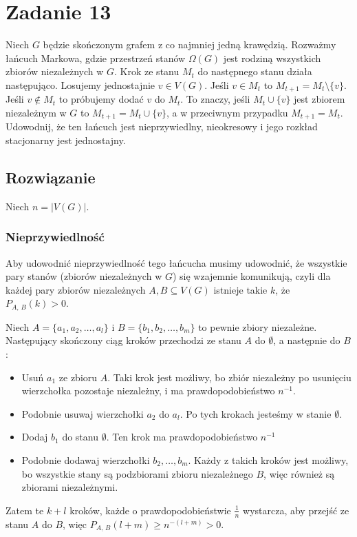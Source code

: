 \section{Zadanie 13}
Niech \(G\) będzie skończonym grafem z co najmniej jedną krawędzią.
Rozważmy łańcuch Markowa, gdzie przestrzeń stanów \(\Omega(G)\) jest rodziną
wszystkich zbiorów niezależnych w \(G\).
Krok ze stanu \(M_t\) do następnego stanu działa następująco.
Losujemy jednostajnie \(v \in V(G)\).
Jeśli \(v \in M_t\) to \(M_{t+1} = M_t \setminus \{v\}\).
Jeśli \(v \notin M_t\) to próbujemy dodać \(v\) do \(M_t\).
To znaczy, jeśli \(M_t \cup \{v\}\) jest zbiorem niezależnym w \(G\)
to \(M_{t+1} = M_t \cup \{v\}\), a w przeciwnym przypadku \(M_{t+1} = M_t\).
Udowodnij, że ten łańcuch jest nieprzywiedlny, nieokresowy i jego rozkład
stacjonarny jest jednostajny.

\subsection*{Rozwiązanie}
Niech \(n = |V(G)|\).

\subsubsection*{Nieprzywiedlność}
Aby udowodnić nieprzywiedlność tego łańcucha musimy udowodnić, że wszystkie
pary stanów (zbiorów niezależnych w \(G\)) się wzajemnie komunikują,
czyli dla każdej pary zbiorów niezależnych \(A, B \subseteq V(G)\)
istnieje takie \(k\), że \(P_{A,\,B}(k) > 0\).

Niech \(A = \{a_1, a_2, \dots, a_l\}\) i \(B = \{b_1, b_2, \dots, b_m\}\)
to pewnie zbiory niezależne. Następujący skończony ciąg kroków przechodzi ze
stanu \(A\) do \(\emptyset\), a następnie do \(B\):
\begin{itemize}
	\item Usuń \(a_1\) ze zbioru \(A\). Taki krok jest możliwy, bo zbiór
	      niezależny po usunięciu wierzchołka pozostaje niezależny, i ma
	      prawdopodobieństwo \(n^{-1}\).
	\item Podobnie usuwaj wierzchołki \(a_2\) do \(a_l\). Po tych krokach jesteśmy
	      w stanie \(\emptyset\).
	\item Dodaj \(b_1\) do stanu \(\emptyset\). Ten krok ma prawdopodobieństwo
	      \(n^{-1}\)
	\item Podobnie dodawaj wierzchołki \(b_2, \dots, b_m\). Każdy z takich kroków
	      jest możliwy, bo wszystkie stany są podzbiorami zbioru niezależnego \(B\),
	      więc również są zbiorami niezależnymi.
\end{itemize}
Zatem te \(k+l\) kroków, każde o prawdopodobieństwie \(\frac{1}{n}\) wystarcza,
aby przejść ze stanu \(A\) do \(B\), więc \(P_{A,\,B}(l+m) \geq n^{-(l+m)} > 0\).

